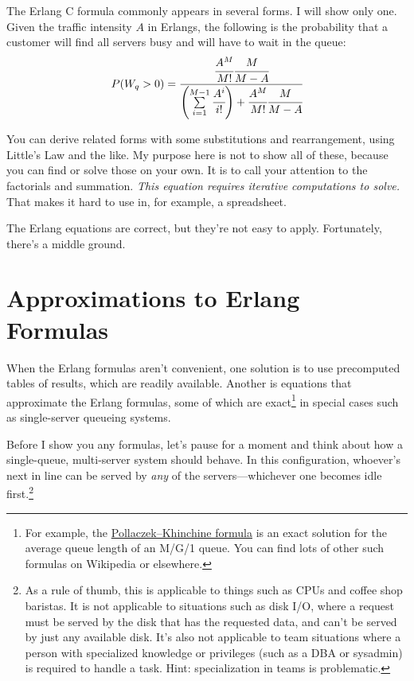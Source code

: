 \documentclass{vivid_layout_pdf}
\begin{document}
The Erlang C formula commonly appears in several forms. I will show only one. Given the traffic intensity $A$ in Erlangs, the following is the probability that a customer will find all servers busy and will have to wait in the queue:
\[
P(W_q > 0) = \cfrac{\cfrac{A^M}{M!}\cfrac{M}{M-A}}{\left( \sum\limits_{i=1}^{M-1} \cfrac{A^i}{i!} \right) + \cfrac{A^M}{M!}\cfrac{M}{M-A}}
\]	%

You can derive related forms with some substitutions and rearrangement, using Little's Law and the like. My purpose here is not to show all of these, because you can find or solve those on your own. It is to call your attention to the factorials and summation. {\itshape This equation requires iterative computations to solve.} That makes it hard to use in, for example, a spreadsheet.

The Erlang equations are correct, but they're not easy to apply.
Fortunately, there's a middle ground.

\section{Approximations to Erlang Formulas}

When the Erlang formulas aren't convenient, one solution is to use precomputed tables of results, which are readily available. Another is equations that approximate the Erlang formulas, some of which are exact\footnote{For example, the \href{https://en.wikipedia.org/wiki/Pollaczek\%E2\%80\%93Khinchine_formula}{Pollaczek–Khinchine formula} is an exact solution for the average queue length of an M/G/1 queue. You can find lots of other such formulas on Wikipedia or elsewhere.} in special cases such as single-server queueing systems.

Before I show you any formulas, let's pause for a moment and think about how a single-queue, multi-server system should behave. In this configuration, whoever's next in line can be served by {\itshape any} of the servers---whichever one becomes idle first.\footnote{As a rule of thumb, this is applicable to things such as CPUs and coffee shop baristas. It is not applicable to situations such as disk I/O, where a request must be served by the disk that has the requested data, and can't be served by just any available disk. It's also not applicable to team situations where a person with specialized knowledge or privileges (such as a DBA or sysadmin) is required to handle a task. Hint: specialization in teams is problematic.}
\end{document}
